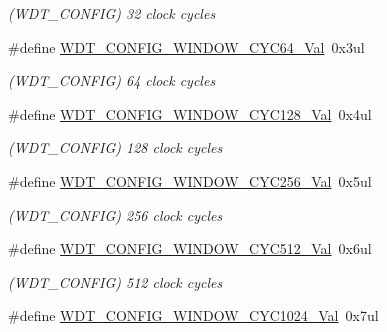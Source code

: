 \begin{DoxyCompactItemize}
\begin{DoxyCompactList}\small\item\em (W\+D\+T\+\_\+\+C\+O\+N\+F\+I\+G) 32 clock cycles \end{DoxyCompactList}\item 
\hypertarget{group___s_a_m_l21___w_d_t_gac49da38933b208ae93a8e042ab11b6e0}{}\#define \hyperlink{group___s_a_m_l21___w_d_t_gac49da38933b208ae93a8e042ab11b6e0}{W\+D\+T\+\_\+\+C\+O\+N\+F\+I\+G\+\_\+\+W\+I\+N\+D\+O\+W\+\_\+\+C\+Y\+C64\+\_\+\+Val}~0x3ul\label{group___s_a_m_l21___w_d_t_gac49da38933b208ae93a8e042ab11b6e0}

\begin{DoxyCompactList}\small\item\em (W\+D\+T\+\_\+\+C\+O\+N\+F\+I\+G) 64 clock cycles \end{DoxyCompactList}\item 
\hypertarget{group___s_a_m_l21___w_d_t_gad416dcc6288734247575eaddfe656d7c}{}\#define \hyperlink{group___s_a_m_l21___w_d_t_gad416dcc6288734247575eaddfe656d7c}{W\+D\+T\+\_\+\+C\+O\+N\+F\+I\+G\+\_\+\+W\+I\+N\+D\+O\+W\+\_\+\+C\+Y\+C128\+\_\+\+Val}~0x4ul\label{group___s_a_m_l21___w_d_t_gad416dcc6288734247575eaddfe656d7c}

\begin{DoxyCompactList}\small\item\em (W\+D\+T\+\_\+\+C\+O\+N\+F\+I\+G) 128 clock cycles \end{DoxyCompactList}\item 
\hypertarget{group___s_a_m_l21___w_d_t_gae8ffa2201aa9c9f31e20c942b3a5cfc9}{}\#define \hyperlink{group___s_a_m_l21___w_d_t_gae8ffa2201aa9c9f31e20c942b3a5cfc9}{W\+D\+T\+\_\+\+C\+O\+N\+F\+I\+G\+\_\+\+W\+I\+N\+D\+O\+W\+\_\+\+C\+Y\+C256\+\_\+\+Val}~0x5ul\label{group___s_a_m_l21___w_d_t_gae8ffa2201aa9c9f31e20c942b3a5cfc9}

\begin{DoxyCompactList}\small\item\em (W\+D\+T\+\_\+\+C\+O\+N\+F\+I\+G) 256 clock cycles \end{DoxyCompactList}\item 
\hypertarget{group___s_a_m_l21___w_d_t_ga6df0e2a9ac9053130ab8673ec4801264}{}\#define \hyperlink{group___s_a_m_l21___w_d_t_ga6df0e2a9ac9053130ab8673ec4801264}{W\+D\+T\+\_\+\+C\+O\+N\+F\+I\+G\+\_\+\+W\+I\+N\+D\+O\+W\+\_\+\+C\+Y\+C512\+\_\+\+Val}~0x6ul\label{group___s_a_m_l21___w_d_t_ga6df0e2a9ac9053130ab8673ec4801264}

\begin{DoxyCompactList}\small\item\em (W\+D\+T\+\_\+\+C\+O\+N\+F\+I\+G) 512 clock cycles \end{DoxyCompactList}\item 
\hypertarget{group___s_a_m_l21___w_d_t_ga24922404455be3a1c28d404d7428e97b}{}\#define \hyperlink{group___s_a_m_l21___w_d_t_ga24922404455be3a1c28d404d7428e97b}{W\+D\+T\+\_\+\+C\+O\+N\+F\+I\+G\+\_\+\+W\+I\+N\+D\+O\+W\+\_\+\+C\+Y\+C1024\+\_\+\+Val}~0x7ul\label{group___s_a_m_l21___w_d_t_ga24922404455be3a1c28d404d7428e97b}


\end{DoxyCompactItemize}
